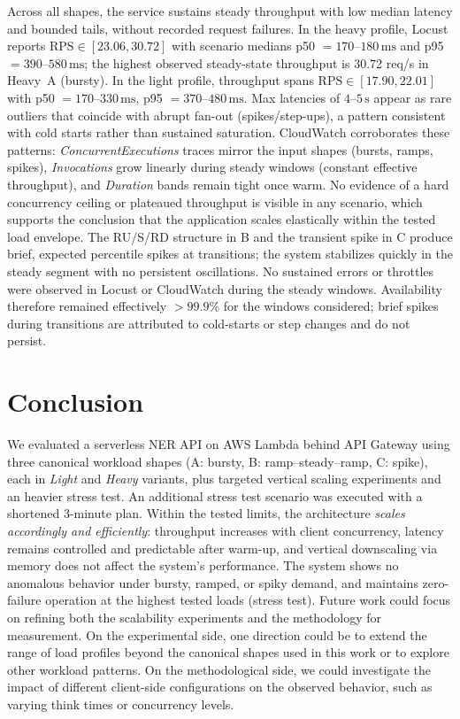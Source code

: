 \documentclass[11pt,a4paper]{article}
\begin{document}
Across all shapes, the service sustains steady throughput with low median latency and bounded tails, without recorded request failures. In the heavy profile, Locust reports \(\text{RPS} \in [23.06, 30.72]\) with scenario medians p50 \(=170\text{--}180\,\mathrm{ms}\) and p95 \(=390\text{--}580\,\mathrm{ms}\); the highest observed steady-state throughput is 30.72 req/s in Heavy~A (bursty). In the light profile, throughput spans \(\text{RPS} \in [17.90, 22.01]\) with p50 \(=170\text{--}330\,\mathrm{ms}\), p95 \(=370\text{--}480\,\mathrm{ms}\). Max latencies of \(4\text{--}5\,\mathrm{s}\) appear as rare outliers that coincide with abrupt fan-out (spikes/step-ups), a pattern consistent with cold starts rather than sustained saturation. CloudWatch corroborates these patterns: \emph{ConcurrentExecutions} traces mirror the input shapes (bursts, ramps, spikes), \emph{Invocations} grow linearly during steady windows (constant effective throughput), and \emph{Duration} bands remain tight once warm. No evidence of a hard concurrency ceiling or plateaued throughput is visible in any scenario, which supports the conclusion that the application scales elastically within the tested load envelope.
The RU/S/RD structure in B and the transient spike in C produce brief, expected percentile spikes at transitions; the system stabilizes quickly in the steady segment with no persistent oscillations.
No sustained errors or throttles were observed in Locust or CloudWatch during the steady windows. Availability therefore remained effectively \(> 99.9\%\) for the windows considered; brief spikes during transitions are attributed to cold-starts or step changes and do not persist.

\section{Conclusion}\label{sec:conclusion}

We evaluated a serverless NER API on AWS Lambda behind API Gateway using three canonical workload shapes (A: bursty, B: ramp–steady–ramp, C: spike), each in \emph{Light} and \emph{Heavy} variants, plus targeted vertical scaling experiments and an heavier stress test. An additional stress test scenario was executed with a shortened 3-minute plan.
Within the tested limits, the architecture \emph{scales accordingly and efficiently}: throughput increases with client concurrency, latency remains controlled and predictable after warm-up, and vertical downscaling via memory does not affect the system's performance. The system shows no anomalous behavior under bursty, ramped, or spiky demand, and maintains zero-failure operation at the highest tested loads (stress test).
Future work could focus on refining both the scalability experiments and the methodology for measurement. On the experimental side, one direction could be to extend the range of load profiles beyond the canonical shapes used in this work or to explore other workload patterns. On the methodological side, we could investigate the impact of different client-side configurations on the observed behavior, such as varying think times or concurrency levels.
\end{document}
